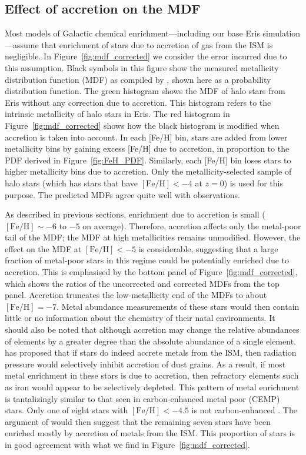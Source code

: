 \documentclass[a4paper,fleqn,usenatbib]{mnras}
\begin{document}
\subsection{Effect of accretion on the MDF}

Most models of Galactic chemical enrichment---including our base Eris
simulation---assume that enrichment of stars due to accretion of gas
from the ISM is negligible.  In Figure~\ref{fig:mdf_corrected} we
consider the error incurred due to this assumption.  Black symbols in
this figure show the measured metallicity distribution function (MDF)
as compiled by \citet{2015ApJ...807..115S}, shown here as a
probability distribution function.  The green histogram shows the MDF
of halo stars from Eris without any correction due to accretion.  This
histogram refers to the intrinsic metallicity of halo stars in Eris.
The red histogram in Figure~\ref{fig:mdf_corrected} shows how the
black histogram is modified when accretion is taken into account.  In
each [Fe/H] bin, stars are added from lower metallicity bins by
gaining excess [Fe/H] due to accretion, in proportion to the PDF
derived in Figure~\ref{fig:FeH_PDF}.  Similarly, each [Fe/H] bin loses
stars to higher metallicity bins due to accretion.  Only the
metallicity-selected sample of halo stars (which has stars that have
$[\mathrm{Fe}/\mathrm{H}]<-4$ at $z=0$) is used for this purpose.  The
predicted MDFs agree quite well with observations.

As described in previous sections, enrichment due to accretion is
small ($[\mathrm{Fe}/\mathrm{H}]\sim -6$ to $-5$ on average).
Therefore, accretion affects only the metal-poor tail of the MDF; the
MDF at high metallicities remains unmodified.  However, the effect on
the MDF at $[\mathrm{Fe}/\mathrm{H}]<-5$ is considerable, suggesting
that a large fraction of metal-poor stars in this regime could be
potentially enriched due to accretion.  This is emphasised by the
bottom panel of Figure~\ref{fig:mdf_corrected}, which shows the ratios
of the uncorrected and corrected MDFs from the top panel.  Accretion
truncates the low-metallicity end of the MDFs to about
$[\mathrm{Fe}/\mathrm{H}]=-7$.  Metal abundance measurements of these
stars would then contain little or no information about the chemistry
of their natal environments.  It should also be noted that although
accretion may change the relative abundances of elements by a greater
degree than the absolute abundance of a single element.
\citet{2015MNRAS.453.2771J} has proposed that if stars do indeed
accrete metals from the ISM, then radiation pressure would selectively
inhibit accretion of dust grains.  As a result, if most metal
enrichment in these stars is due to accretion, then refractory
elements such as iron would appear to be selectively depleted.  This
pattern of metal enrichment is tantalizingly similar to that seen in
carbon-enhanced metal poor (CEMP) stars.  Only one of eight stars with
$[\mathrm{Fe}/\mathrm{H}]<-4.5$ is not carbon-enhanced
\citep{2011Natur.477...67C}.  The argument of
\citet{2015MNRAS.453.2771J} would then suggest that the remaining
seven stars have been enriched mostly by accretion of metals from the
ISM.  This proportion of stars is in good agreement with what we find
in Figure~\ref{fig:mdf_corrected}.
\end{document}
